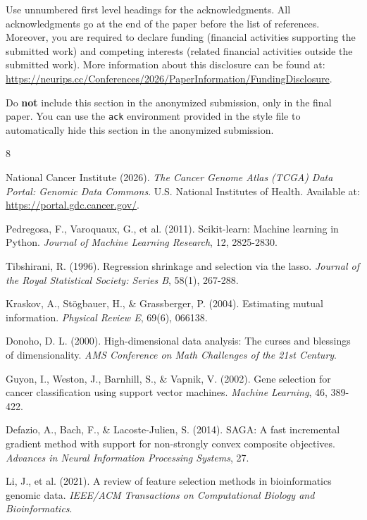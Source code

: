 \documentclass{article}
\begin{document}
\begin{ack}
Use unnumbered first level headings for the acknowledgments. All acknowledgments
go at the end of the paper before the list of references. Moreover, you are required to declare
funding (financial activities supporting the submitted work) and competing interests (related financial activities outside the submitted work).
More information about this disclosure can be found at: \url{https://neurips.cc/Conferences/2026/PaperInformation/FundingDisclosure}.


Do {\bf not} include this section in the anonymized submission, only in the final paper. You can use the \texttt{ack} environment provided in the style file to automatically hide this section in the anonymized submission.
\end{ack}









\begin{thebibliography}{8}

National Cancer Institute (2026). \textit{The Cancer Genome Atlas (TCGA) Data Portal: Genomic Data Commons}. U.S. National Institutes of Health. Available at: \url{https://portal.gdc.cancer.gov/}.

Pedregosa, F., Varoquaux, G., et al. (2011). Scikit-learn: Machine learning in Python. \textit{Journal of Machine Learning Research}, 12, 2825-2830.

Tibshirani, R. (1996). Regression shrinkage and selection via the lasso. \textit{Journal of the Royal Statistical Society: Series B}, 58(1), 267-288.

Kraskov, A., Stögbauer, H., \& Grassberger, P. (2004). Estimating mutual information. \textit{Physical Review E}, 69(6), 066138.

Donoho, D. L. (2000). High-dimensional data analysis: The curses and blessings of dimensionality. \textit{AMS Conference on Math Challenges of the 21st Century}.

Guyon, I., Weston, J., Barnhill, S., \& Vapnik, V. (2002). Gene selection for cancer classification using support vector machines. \textit{Machine Learning}, 46, 389-422.

Defazio, A., Bach, F., \& Lacoste-Julien, S. (2014). SAGA: A fast incremental gradient method with support for non-strongly convex composite objectives. \textit{Advances in Neural Information Processing Systems}, 27.

Li, J., et al. (2021). A review of feature selection methods in bioinformatics genomic data. \textit{IEEE/ACM Transactions on Computational Biology and Bioinformatics}.

\end{thebibliography}
\end{document}
